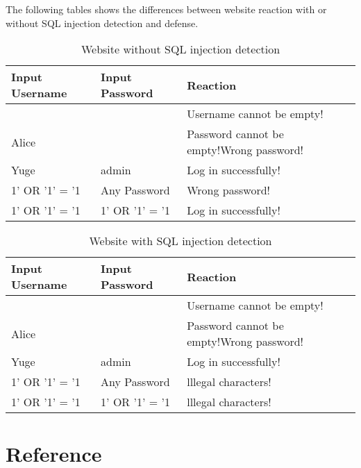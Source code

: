 \documentclass[12pt]{article}
\begin{document}
The following tables shows the differences between website reaction with or without SQL injection detection and defense.

\begin{table}[htbp]
\centering
\caption{Website without SQL injection detection}
\begin{tabular}{ l l   p{9cm}  }
\hline
  Input Username & Input Password & Reaction \\
  \hline
   & & Username cannot be empty! \\
  Alice & &Password cannot be empty!Wrong password!  \\
  Yuge & admin & Log in successfully! \\
  1' OR '1' = '1 & Any Password & Wrong password! \\
  1' OR '1' = '1 & 1' OR '1' = '1 & Log in successfully! \\ 
    \hline
\end{tabular}
\end{table}

\begin{table}[htbp]
\centering
\caption{Website with SQL injection detection}
\begin{tabular}{ l l   p{9cm}  }
\hline
  Input Username & Input Password & Reaction \\
  \hline
   & & Username cannot be empty! \\
  Alice & &Password cannot be empty!Wrong password!  \\
  Yuge & admin & Log in successfully! \\
  1' OR '1' = '1 & Any Password & lllegal characters! \\
  1' OR '1' = '1 & 1' OR '1' = '1 & lllegal characters! \\ 
    \hline
\end{tabular}
\end{table}

\newpage
\section{Reference}
\end{document}
